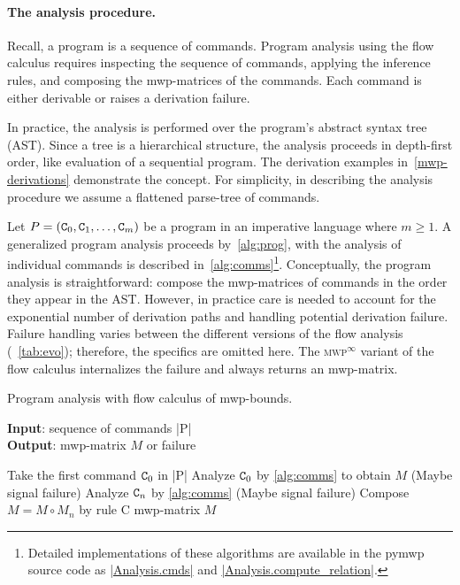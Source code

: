 \paragraph*{The analysis procedure.}
Recall, a program is a sequence of commands.
Program analysis using the flow calculus requires inspecting the sequence of commands,
applying the inference rules, and composing the mwp-matrices of the commands.
Each command is either derivable or raises a derivation failure.

In practice, the analysis is performed over the program's abstract syntax tree (AST).
Since a tree is a hierarchical structure, the analysis proceeds in depth-first order, like evaluation of a sequential program.
The derivation examples in~\autoref{mwp-derivations} demonstrate the concept.
For simplicity, in describing the analysis procedure we assume a flattened parse-tree of commands.


Let \(P = (\prm{C}_0,\prm{C}_1,\ldots,\prm{C}_m) \) be a program in an imperative language where \(m \geq 1\).
A generalized program analysis proceeds by~\autoref{alg:prog}, with the analysis of individual commands is described in~\autoref{alg:comms}\footnote{
    Detailed implementations of these algorithms are available in the pymwp source code as
    \href{https://github.com/statycc/pymwp/blob/40c9ceb644c734f15f82e63edc515716c4f35841/pymwp/analysis.py\#L118}
    {\pr|Analysis.cmds|} and
    \href{https://github.com/statycc/pymwp/blob/40c9ceb644c734f15f82e63edc515716c4f35841/pymwp/analysis.py\#L185}{\pr|Analysis.compute\_relation|}.}.
Conceptually, the program analysis is straightforward: compose the mwp-matrices of commands in the order they appear in the AST\@.
However, in practice care is needed to account for the exponential number of derivation paths
and handling potential derivation failure.
Failure handling varies between the different versions of the flow analysis (\cf~\autoref{tab:evo});
therefore, the specifics are omitted here.
The \textsc{mwp}\(^\infty\) variant of the flow calculus internalizes the failure and always returns an mwp-matrix.

\begin{algorithm}
    \caption[Program analysis with flow calculus of mwp-bounds]
    {Program analysis with flow calculus of mwp-bounds.}\label{alg:prog}
    \textbf{Input}: sequence of commands \pr|P| \\
    \textbf{Output}: mwp-matrix \(M\) or failure
    \begin{algorithmic}[1]
        \State Take the first command \(\prm{C}_0\) in \pr|P|
        \State Analyze \(\prm{C}_0\) by \autoref{alg:comms} to obtain \(M\)
        \State (Maybe signal failure)
            \State Analyze \(\prm{C}_n\) by \autoref{alg:comms}
            \State (Maybe signal failure)
            \State Compose \(M = M \circ M_n \) by rule C
        \EndFor
        \State \Return mwp-matrix \(M\) 
    \end{algorithmic}
\end{algorithm}

